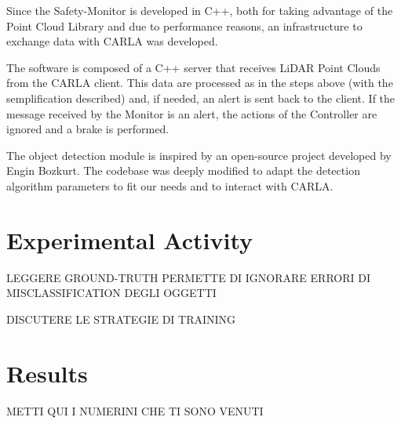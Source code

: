 Since the Safety-Monitor is developed in C++, both for taking advantage of the Point Cloud Library and due to performance reasons, an infrastructure to exchange data with CARLA was developed.

The software is composed of a C++ server that receives LiDAR Point Clouds from the CARLA client. This data are processed as in the steps above (with the semplification described) and, if needed, an alert is sent back to the client. If the message received by the Monitor is an alert, the actions of the Controller are ignored and a brake is performed.

The object detection module is inspired by an open-source project developed by Engin Bozkurt\cite{LOD}. The codebase was deeply modified to adapt the detection algorithm parameters to fit our needs and to interact with CARLA.


\section{Experimental Activity}


LEGGERE GROUND-TRUTH PERMETTE DI IGNORARE ERRORI DI MISCLASSIFICATION DEGLI OGGETTI

DISCUTERE LE STRATEGIE DI TRAINING

\section{Results}

METTI QUI I NUMERINI CHE TI SONO VENUTI